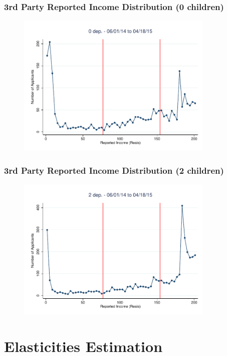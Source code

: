 \documentclass[xcolor=pdftex,dvipsnames,table]{beamer}
\begin{document}
\begin{frame}
\frametitle{3rd Party Reported Income Distribution (0 children)}
\begin{figure}[H]
\begin{center}
\includegraphics[height=2.7in]{Rais_060114_non_0_bin3p5.pdf}
\end{center}
\end{figure}
\end{frame}

\begin{frame}
\frametitle{3rd Party Reported Income Distribution (2 children)}
\begin{figure}[H]
\begin{center}
\includegraphics[height=2.7in]{Rais_060114_non_2_bin3p5.pdf}
\end{center}
\end{figure}
\end{frame}

\section{Elasticities Estimation}
\end{document}
